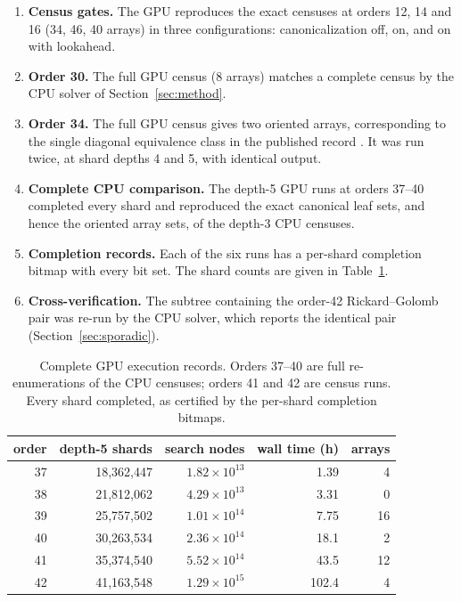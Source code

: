\documentclass[11pt]{article}
\begin{document}
\begin{enumerate}
\item \textbf{Census gates.}  The GPU reproduces the exact censuses at
orders 12, 14 and 16 (34, 46, 40 arrays) in three configurations:
canonicalization off, on, and on with lookahead.
\item \textbf{Order 30.}  The full GPU census (8 arrays) matches a complete
census by the CPU solver of Section~\ref{sec:method}.
\item \textbf{Order 34.}  The full GPU census gives two oriented arrays,
corresponding to the single diagonal equivalence class in the published
record \cite{RickardDrakakis2009Symmetry}.  It was run twice, at shard
depths 4 and 5, with identical output.
\item \textbf{Complete CPU comparison.}  The depth-5 GPU runs at orders
37--40 completed every shard and reproduced the exact canonical leaf sets,
and hence the oriented array sets, of the depth-3 CPU censuses.
\item \textbf{Completion records.}  Each of the six runs has a per-shard
completion bitmap with every bit set.  The shard counts are given in
Table~\ref{tab:censusgpu}.
\item \textbf{Cross-verification.}  The subtree containing the order-42 Rickard--Golomb pair was
re-run by the CPU solver, which reports the identical pair
(Section~\ref{sec:sporadic}).
\end{enumerate}

\begin{table}[ht]
\centering
\begin{tabular}{rrrrr}
\toprule
order & depth-5 shards & search nodes & wall time (h) & arrays \\
\midrule
37 & 18{,}362{,}447 & $1.82\times 10^{13}$ & 1.39 & 4 \\
38 & 21{,}812{,}062 & $4.29\times 10^{13}$ & 3.31 & 0 \\
39 & 25{,}757{,}502 & $1.01\times 10^{14}$ & 7.75 & 16 \\
40 & 30{,}263{,}534 & $2.36\times 10^{14}$ & 18.1 & 2 \\
\midrule
41 & 35{,}374{,}540 & $5.52\times 10^{14}$ & 43.5 & 12 \\
42 & 41{,}163{,}548 & $1.29\times 10^{15}$ & 102.4 & 4 \\
\bottomrule
\end{tabular}
\caption{Complete GPU execution records.  Orders 37--40 are full
re-enumerations of the CPU censuses; orders 41 and 42 are census runs.
Every shard completed, as certified by the per-shard completion bitmaps.}
\label{tab:censusgpu}
\end{table}
\end{document}
